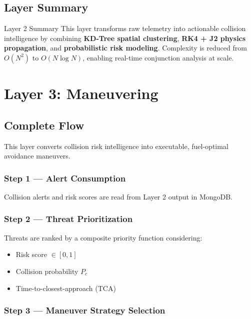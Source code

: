\documentclass[11pt, a4paper]{article}
\begin{document}
\subsection{Layer Summary}

\begin{layerbox}[colframe=safegreen]{Layer 2 Summary}
This layer transforms raw telemetry into actionable collision intelligence by combining
\textbf{KD-Tree spatial clustering}, \textbf{RK4 + J2 physics propagation}, and
\textbf{probabilistic risk modeling}. Complexity is reduced from $O(N^2)$ to $O(N \log N)$,
enabling real-time conjunction analysis at scale.
\end{layerbox}

\section{Layer 3: Maneuvering}

\subsection{Complete Flow}

This layer converts collision risk intelligence into executable, fuel-optimal avoidance maneuvers.

\subsubsection{Step 1 --- Alert Consumption}

Collision alerts and risk scores are read from Layer 2 output in MongoDB.

\subsubsection{Step 2 --- Threat Prioritization}

Threats are ranked by a composite priority function considering:
\begin{itemize}[leftmargin=1.5cm]
  \item Risk score $\in [0, 1]$
  \item Collision probability $P_c$
  \item Time-to-closest-approach (TCA)
\end{itemize}

\subsubsection{Step 3 --- Maneuver Strategy Selection}
\end{document}
